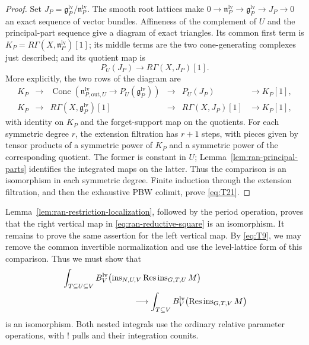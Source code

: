 \documentclass[11pt]{article}
\numberwithin{equation}{section}
\theoremstyle{definition}
\theoremstyle{remark}
\begin{document}
\begin{proof}
Set $J_P=\mathfrak g^{\mathrm{lv}}_P/\mathfrak n^{\mathrm{lv}}_P$.
The smooth root lattices make
$0\to\mathfrak n^{\mathrm{lv}}_P\to
\mathfrak g^{\mathrm{lv}}_P\to J_P\to0$ an exact sequence of vector
bundles.  Affineness of the complement of $U$ and the principal-part
sequence give a diagram of exact triangles.  Its common first term is
$K_P=R\Gamma(X,\mathfrak n^{\mathrm{lv}}_P)[1]$; its middle terms are the
two cone-generating complexes just described; and its quotient map is
\[
        P_U(J_P)\longrightarrow R\Gamma(X,J_P)[1].
\]
More explicitly, the two rows of the diagram are
\[
\begin{array}{cccccc}
 K_P&\longrightarrow&
 \operatorname{Cone}(\mathfrak n^{\mathrm{lv}}_{P,\mathrm{out},U}
                  \to P_U(\mathfrak g^{\mathrm{lv}}_P))
 &\longrightarrow&P_U(J_P)&\longrightarrow K_P[1],\\[2pt]
 K_P&\longrightarrow&R\Gamma(X,\mathfrak g^{\mathrm{lv}}_P)[1]
 &\longrightarrow&R\Gamma(X,J_P)[1]&\longrightarrow K_P[1],
\end{array}
\]
with identity on $K_P$ and the forget-support map on the quotients.
For each symmetric degree $r$, the extension filtration has $r+1$ steps,
with pieces given by tensor products of a symmetric power of $K_P$ and a
symmetric power of the corresponding quotient.  The former is constant
in $U$; Lemma~\ref{lem:ran-principal-parts} identifies the integrated maps
on the latter.  Thus the comparison is an isomorphism in each symmetric
degree.  Finite induction through the extension filtration, and then the
exhaustive PBW colimit, prove \eqref{eq:T21}.
\end{proof}

Lemma~\ref{lem:ran-restriction-localization}, followed by the period
operation, proves that the right vertical map in
\eqref{eq:ran-reductive-square} is an isomorphism.  It remains to prove
the same assertion for the left vertical map.  By \eqref{eq:T9}, we may
remove the common invertible normalization and use the level-lattice
form of this comparison.  Thus we must show that
\begin{equation}\label{eq:T23}
\begin{aligned}
 &\int_{T\subseteq U\subseteq V}
 B_V^{\mathrm{lv}}\bigl(
    \operatorname{ins}_{N,U,V}\operatorname{Res}
                    \operatorname{ins}_{G,T,U}M\bigr)\\
 &\hspace{30mm}\longrightarrow
 \int_{T\subseteq V}B_V^{\mathrm{lv}}\bigl(
                 \operatorname{Res}\operatorname{ins}_{G,T,V}M\bigr)
\end{aligned}
\end{equation}
is an isomorphism.  Both nested integrals use the ordinary relative
parameter operations, with ! pulls and their integration counits.
\end{document}

